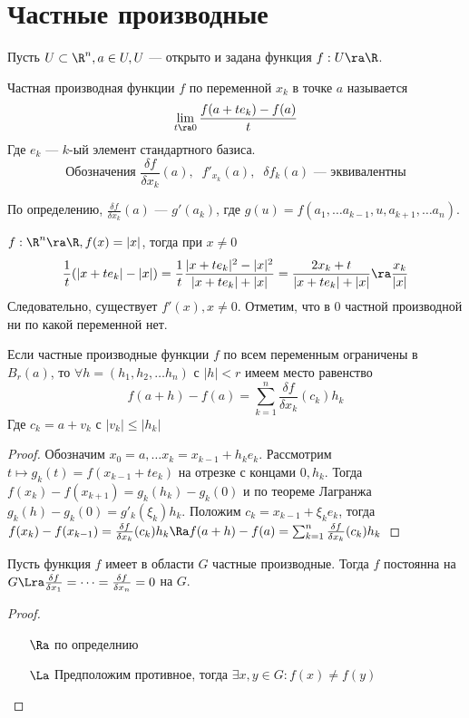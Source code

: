 \section{Частные производные}
Пусть \(U \subset \R^n, a \in U, U\) --- открыто и задана функция \(f: U \ra \R\).

\begin{definition}
    Частная производная функции \(f\) по переменной \(x_k\) в точке \(a\) называется
    \[\lim_{t \ra 0} \frac{f(a + te_k) - f(a)}{t}\]
    Где \(e_k\) --- \(k\)-ый элемент стандартного базиса.
    \[\text{Обозначения }\frac{\delta f}{\delta x_k}(a),\;\;f'_{x_k}(a),\;\;\delta f_k(a)\text{ --- эквивалентны}\]
\end{definition}

\begin{note}
    По определению, \(\frac{\delta f}{\delta x_k}(a)\) --- \(g'(a_k)\), где \(g(u) = f(a_1, \dots a_{k - 1}, u, a_{k + 1}, \dots a_n)\).
\end{note}

\begin{example}
    \(f: \R^n \ra \R, f(x) = |x|\), тогда при \(x \ne 0\)
    \[\frac{1}{t}(|x + te_k| - |x|) = \frac{1}{t} \frac{|x + te_k|^2 - |x|^2}{|x + te_k| + |x|} = \frac{2x_k + t}{|x + te_k| + |x|} \ra \frac{x_k}{|x|}\]
    Следовательно, существует \(f'(x), x \ne 0\). Отметим, что в \(0\) частной производной ни по какой переменной нет.
\end{example}

\begin{theorem}[О приращении]
    Если частные производные функции \(f\) по всем переменным ограничены в \(B_r(a)\), то \(\forall h = (h_1, h_2, \dots h_n)\) с \(|h| < r\) имеем место равенство
    \[f(a + h) - f(a) = \sum_{k = 1}^n \frac{\delta f}{\delta x_k}(c_k)h_k\]
    Где \(c_k = a + v_k\) с \(|v_k| \le |h_k|\)
\end{theorem}
\begin{proof}
    Обозначим \(x_0 = a, \dots x_k = x_{k - 1} + h_ke_k\). Рассмотрим \(t \mapsto g_k(t) = f(x_{k - 1} + te_k)\) на отрезке с концами \(0, h_k\). Тогда \(f(x_k) - f(x_{k + 1}) = g_k(h_k) - g_k(0)\) и по теореме Лагранжа \(g_k(h) - g_k(0) = g'_k(\xi_k)h_k\). Положим \(c_k = x_{k - 1} + \xi_ke_k\), тогда \(f(x_k) - f(x_{k - 1}) = \frac{\delta f}{\delta x_k}(c_k)h_k \Ra f(a + h) - f(a) = \sum_{k = 1}^n \frac{\delta f}{\delta x_k}(c_k)h_k\)
\end{proof}

\begin{corollary}
    Пусть функция \(f\) имеет в области \(G\) частные производные. Тогда \(f\) постоянна на \(G \Lra \frac{\delta f}{\delta x_1} = \dots = \frac{\delta f}{\delta x_n} = 0\) на \(G\).
\end{corollary}
\begin{proof}\indent
    \begin{enumerate}
        \item[\(\Ra\)] по определнию
        \item[\(\La\)] Предположим противное, тогда \(\exists x, y \in G: f(x) \ne f(y)\)
    \end{enumerate}
\end{proof}

